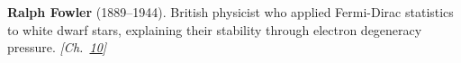 \textbf{Ralph Fowler} (1889–1944). British physicist who applied Fermi-Dirac statistics to white dwarf stars, explaining their stability through electron degeneracy pressure. \emph{[Ch.~\hyperref[ch:solarfusionquantumtunneling]{10}]}

